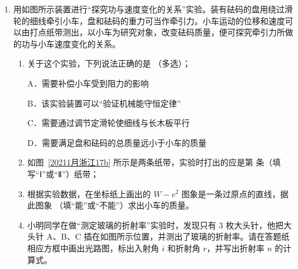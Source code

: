 \documentclass[\gkver]{gaokaozhenti}
\begin{document}
\begin{enumerate}
{故选 BD。
}

\item
用如图所示装置进行“探究功与速度变化的关系”实验。装有砝码的盘用绕过滑轮的细线牵引小车，盘和砝码的重力可当作牵引力。小车运动的位移和速度可以由打点纸带测出，以小车为研究对象，改变砝码质量，便可探究牵引力所做的功与小车速度变化的关系。


\begin{enumerate}
	\item
	关于这个实验，下列说法正确的是 （多选）；

	A．需要补偿小车受到阻力的影响

	B．该实验装置可以“验证机械能守恒定律”

	C．需要通过调节定滑轮使细线与长木板平行

	D．需要满足盘和砝码的总质量远小于小车的质量
	\item
	如图~\ref{20211月浙江17b} 所示是两条纸带，实验时打出的应是第  条（填写“Ⅰ”或“Ⅱ”）纸带；

	\item
	根据实验数据，在坐标纸上画出的 $W-v^{2}$ 图象是一条过原点的直线，据此图象 （填“能”或“不能”）求出小车的质量。
	\item
	小明同学在做“测定玻璃的折射率”实验时，发现只有 3 枚大头针，他把大头针 A、B、C 插在如图所示位置，并测出了玻璃的折射率。请在答题纸相应方框中画出光路图，标出入射角 $i$ 和折射角 $r$，并写出折射率 $n$ 的计算式。

\end{enumerate}

\end{enumerate}
\end{document}
